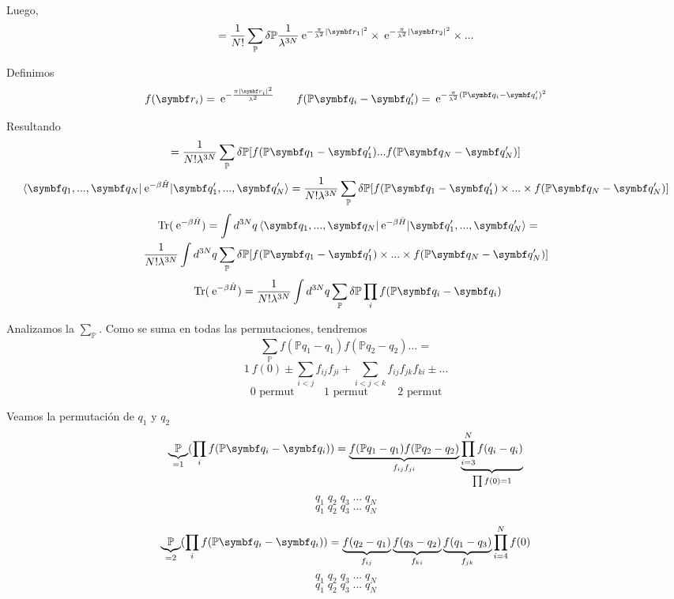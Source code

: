 \documentclass[10pt,oneside]{CBFT_book}
\begin{document}
Luego,
\[
	= \frac{1}{N!} \sum_{ \mathbb{P} } \delta\mathbb{P} \frac{1}{\lambda^{3N}}
	\euler^{ -\frac{\pi}{\lambda^2} |\vb{r}_1|^2 } \times \euler^{ -\frac{\pi}{\lambda^2} |\vb{r}_2|^2 } \times ...
\]

Definimos
\[
	f( \vb{r}_i ) = \euler^{ -\frac{ \pi |\vb{r}_i|^2 }{ \lambda^2 } } \qquad 
	f( \mathbb{P}\vb{q}_i - \vb{q}_i' ) = \euler^{ -\frac{ \pi }{ \lambda^2 }(\mathbb{P}\vb{q}_i - \vb{q}_i')^2 }
\]

Resultando 
\[
	= \frac{1}{N!\lambda^{3N}} \sum_{\mathbb{P}} \delta\mathbb{P} [ f( \mathbb{P}\vb{q}_1 - \vb{q}_1' ) ... 
	f( \mathbb{P}\vb{q}_N - \vb{q}_N' )]
\]
\[
	\braket{ \vb{q}_1,..., \vb{q}_N|\euler^{-\beta\hat{H}}| \vb{q}_1',..., \vb{q}_N' } = 
	\frac{1}{N!\lambda^{3N}} \sum_{\mathbb{P}} \delta\mathbb{P} [ f( \mathbb{P}\vb{q}_1 - \vb{q}_1' ) \times 
	... \times f( \mathbb{P}\vb{q}_N - \vb{q}_N' )]
\]
\begin{multline*}
	\text{ Tr} (\euler^{-\beta\hat{H}}) = \int d^{3N} q
	\braket{ \vb{q}_1,..., \vb{q}_N|\euler^{-\beta\hat{H}}| \vb{q}_1',..., \vb{q}_N' } =\\
	\frac{1}{N!\lambda^{3N}} \int d^{3N}q \sum_{\mathbb{P}} \delta\mathbb{P} [ f( \mathbb{P}\vb{q}_1 - \vb{q}_1' ) 
	\times ... \times f( \mathbb{P}\vb{q}_N - \vb{q}_N' )]
\end{multline*}
\[
	\text{ Tr} (\euler^{-\beta\hat{H}}) = \frac{1}{N!\lambda^{3N}} \int d^{3N}q \sum_{\mathbb{P}} 
	\delta\mathbb{P} \prod_i f( \mathbb{P}\vb{q}_i - \vb{q}_i )
\]

Analizamos la $\sum_{\mathbb{P}}$. Como se suma en todas las permutaciones, tendremos
\[
	\sum_{\mathbb{P}} f(\mathbb{P}{q}_1 - {q}_1) f(\mathbb{P}{q}_2 - {q}_2) ... =
\]
\[
	1 \: f(0) \pm \sum_{i<j} f_{ij} f_{ji} + \sum_{i<j<k} f_{ij} f_{jk} f_{ki} \pm ...
\]
\[
	\text{ 0 permut } \qquad \text{ 1 permut } \qquad \text{ 2 permut }
\]

Veamos la permutación de $q_1$ y $q_2$
\[
	\underbrace{\mathbb{P}}_{=1} (\prod_i f( \mathbb{P}\vb{q}_i - \vb{q}_i ) ) =
	\underbrace{f(\mathbb{P}{q}_1 - {q}_1) f(\mathbb{P}{q}_2 - {q}_2)}_{f_{ij}f_{ji}}
	\underbrace{\prod_{i=3}^N f(q_i - q_i)}_{\prod f(0)=1}
\]
\[
	q_1 \; q_2 \; q_3 \; ... \; q_N
\]
\[
	q_1 \; q_2 \; q_3 \; ... \; q_N
\]

\[
	\underbrace{\mathbb{P}}_{=2} (\prod_i f( \mathbb{P}\vb{q}_i - \vb{q}_i ) ) =
	\underbrace{f( {q}_2 - {q}_1 )}_{f_{ij}} \underbrace{f( {q}_3 - {q}_2 )}_{f_{ki}}
	\underbrace{f( {q}_1 - {q}_3 )}_{f_{jk}}
	\prod_{i=4}^N f(0)
\]
\[
	q_1 \; q_2 \; q_3 \; ... \; q_N
\]
\[
	q_1 \; q_2 \; q_3 \; ... \; q_N
\]
\end{document}
